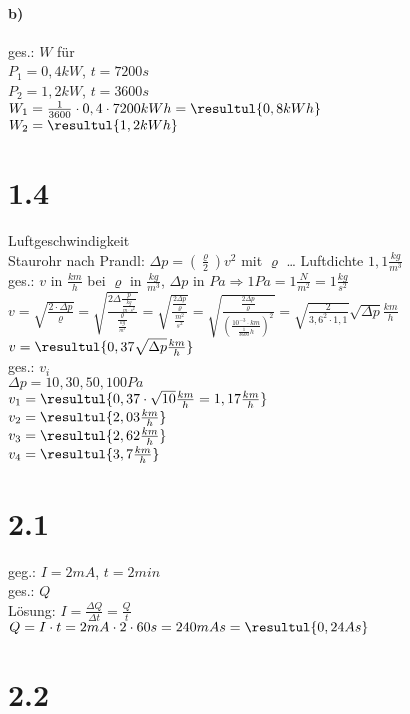 \documentclass{scrreprt}
\begin{document}
\paragraph{b)} ges.: $W$ für\\
$P_1=0,4kW$, $t=7200s$\\
$P_2=1,2kW$, $t=3600s$\medskip\\
$W_1=\frac{1}{3600} \cdot 0,4 \cdot 7200kWh=\resultul{0,8kWh}$\smallskip\\
$W_2=\resultul{1,2kWh}$

\section*{1.4}
Luftgeschwindigkeit\\
Staurohr nach Prandl: $\Delta p = (\frac{\varrho}{2})v^2$ mit $\varrho$ … Luftdichte $1,1 \frac{kg}{m^3}$\\
ges.: $v$ in $\frac{km}{h}$ bei $\varrho$ in $\frac{kg}{m^3}$, $\Delta p$ in $Pa \Rightarrow 1 Pa = 1\frac{N}{m^2}= 1 \frac{kg}{s^2}$\\
$v=\sqrt{\frac{2\cdot \Delta p}{\varrho}}=\sqrt{\frac{2\Delta \frac{p}{\frac{kg}{m\cdot s^2}}}{\frac{\varrho}{\frac{kg}{m^3}}}}=\sqrt{\frac{\frac{2\Delta p}{\varrho}}{\frac{m^2}{s^2}}}=\sqrt{\frac{\frac{2 \Delta p}{\varrho}}{(\frac{10^{-3}\cdot km}{\frac{1}{3600}h})^2}}=\sqrt{\frac{2}{3,6^2\cdot 1,1}}\sqrt{\Delta p}\frac{km}{h}$\\
$v=\resultul{0,37\sqrt{\Delta p}\frac{km}{h}}$\medskip\\
ges.: $v_i$\\
$\Delta p = 10,30,50,100 Pa$\\
$v_1=\resultul{0,37\cdot \sqrt{10}\frac{km}{h}=1,17\frac{km}{h}}$\\
$v_2=\resultul{2,03\frac{km}{h}}$\\
$v_3=\resultul{2,62\frac{km}{h}}$\\
$v_4=\resultul{3,7 \frac{km}{h}}$

\section*{2.1}

geg.: $I=2mA$, $t=2 min$\\
ges.: $Q$\\
Lösung: $\boxed{I=\frac{\Delta Q}{\Delta t}=\frac{Q}{t}}$\\
$Q=I\cdot t=2mA \cdot 2 \cdot 60s = 240 mAs = \resultul{0,24 As}$

\section*{2.2}
\end{document}
